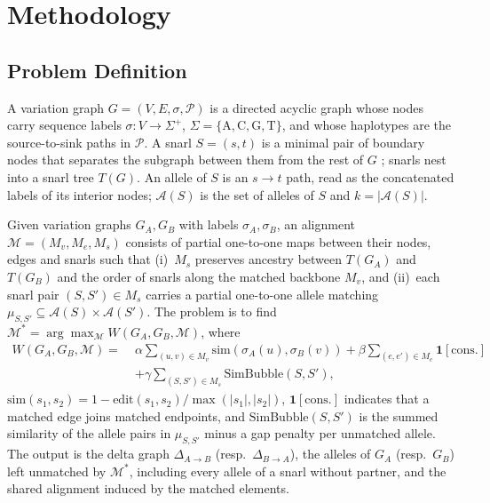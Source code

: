 \section{Methodology}

\subsection{Problem Definition}
\label{sec:problem}

\begin{definition}
A variation graph $G=(V,E,\sigma,\mathcal{P})$ is a directed acyclic graph whose nodes carry sequence labels $\sigma:V\to\Sigma^{+}$, $\Sigma=\{\mathrm{A,C,G,T}\}$, and whose haplotypes are the source-to-sink paths in $\mathcal{P}$. A snarl $S=(s,t)$ is a minimal pair of boundary nodes that separates the subgraph between them from the rest of $G$ \cite{paten2018superbubbles}; snarls nest into a snarl tree $T(G)$. An allele of $S$ is an $s\!\to\!t$ path, read as the concatenated labels of its interior nodes; $\mathcal{A}(S)$ is the set of alleles of $S$ and $k=|\mathcal{A}(S)|$.
\end{definition}

\begin{definition}
Given variation graphs $G_A,G_B$ with labels $\sigma_A,\sigma_B$, an alignment $\mathcal{M}=(M_v,M_e,M_s)$ consists of partial one-to-one maps between their nodes, edges and snarls such that (i)~$M_s$ preserves ancestry between $T(G_A)$ and $T(G_B)$ and the order of snarls along the matched backbone $M_v$, and (ii)~each snarl pair $(S,S')\in M_s$ carries a partial one-to-one allele matching $\mu_{S,S'}\subseteq\mathcal{A}(S)\times\mathcal{A}(S')$. The problem is to find $\mathcal{M}^{\ast}=\arg\max_{\mathcal{M}}W(G_A,G_B,\mathcal{M})$, where
\begin{align}
W(G_A,G_B,\mathcal{M}) =\;
&\alpha\!\!\sum_{(u,v)\in M_v}\!\!\mathrm{sim}(\sigma_A(u),\sigma_B(v))
+\beta\!\!\sum_{(e,e')\in M_e}\!\!\mathbf{1}[\text{cons.}] \nonumber\\
&+\gamma\!\!\sum_{(S,S')\in M_s}\!\!\mathrm{SimBubble}(S,S'),
\label{eq:score}
\end{align}
$\mathrm{sim}(s_1,s_2)=1-\mathrm{edit}(s_1,s_2)/\max(|s_1|,|s_2|)$, $\mathbf{1}[\text{cons.}]$ indicates that a matched edge joins matched endpoints, and $\mathrm{SimBubble}(S,S')$ is the summed similarity of the allele pairs in $\mu_{S,S'}$ minus a gap penalty per unmatched allele. The output is the delta graph $\Delta_{A\to B}$ (resp.\ $\Delta_{B\to A}$), the alleles of $G_A$ (resp.\ $G_B$) left unmatched by $\mathcal{M}^{\ast}$, including every allele of a snarl without partner, and the shared alignment induced by the matched elements.
\end{definition}

